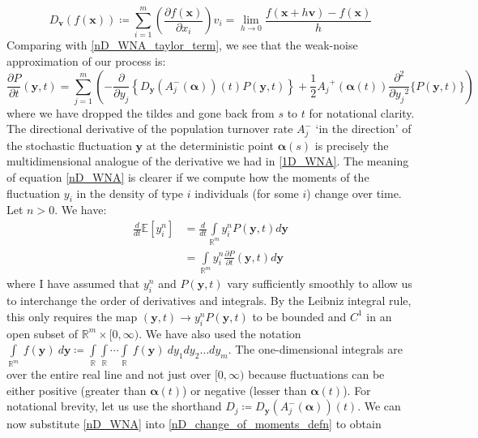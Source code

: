 \begin{equation}
\label{directional_derivative_defn}
D_{\mathbf{v}}(f(\mathbf{x})) \coloneqq \sum\limits_{i=1}^{m}\left(\frac{\partial f(\mathbf{x})}{\partial x_i}\right)v_i = \lim_{h \to 0}\frac{f(\mathbf{x}+h\mathbf{v})-f(\mathbf{x})}{h}
\end{equation}
Comparing with \eqref{nD_WNA_taylor_term}, we see that the weak-noise approximation of our process is:
\begin{equation}
\label{nD_WNA}
\frac{\partial P}{\partial t}(\mathbf{y},t) = \sum\limits_{j=1}^{m}\left(-\frac{\partial}{\partial y_j}\left\{D_{\mathbf{y}}(A_j^-(\boldsymbol{\alpha}))(t)P(\mathbf{y},t)\right\}+\frac{1}{2}{A_j}^{+}(\boldsymbol{\alpha}(t))\frac{\partial^2}{\partial{y_j}^2}\{P(\mathbf{y},t)\}\right)
\end{equation}
where we have dropped the tildes and gone back from $s$ to $t$ for notational clarity. The directional derivative of the population turnover rate $A_j^-$ `in the direction' of the stochastic fluctuation $\mathbf{y}$ at the deterministic point $\boldsymbol{\alpha}(s)$ is precisely the multidimensional analogue of the derivative we had in \eqref{1D_WNA}. The meaning of equation \eqref{nD_WNA} is clearer if we compute how the moments of the fluctuation $y_i$ in the density of type $i$ individuals (for some $i$) change over time. Let $n > 0$. We have:
\begin{align}
\frac{d}{dt}\mathbb{E}[y_i^n] &= \frac{d}{dt}\int\limits_{\mathbb{R}^m}y_i^nP(\mathbf{y},t)d\mathbf{y}\\
&= \int\limits_{\mathbb{R}^m}y_i^n\frac{\partial P}{\partial t}(\mathbf{y},t)d\mathbf{y}\label{nD_change_of_moments_defn}
\end{align}
where I have assumed that $y_i^n$ and $P(\mathbf{y},t)$ vary sufficiently smoothly to allow us to interchange the order of derivatives and integrals. By the Leibniz integral rule, this only requires the map $(\mathbf{y},t) \to y_i^nP(\mathbf{y},t)$ to be bounded and $C^1$ in an open subset of $\mathbb{R}^m \times [0,\infty)$. We have also used the notation $\displaystyle \int\limits_{\mathbb{R}^m} \ f(\mathbf{y}) \ d\mathbf{y} \coloneqq \int\limits_{\mathbb{R}}\int\limits_{\mathbb{R}}\cdots\int\limits_{\mathbb{R}} \ f(\mathbf{y}) \ dy_1 dy_2 \ldots dy_m$. The one-dimensional integrals are over the entire real line and not just over $[0,\infty)$ because fluctuations can be either positive (greater than $\boldsymbol{\alpha}(t)$) or negative (lesser than $\boldsymbol{\alpha}(t)$). For notational brevity, let us use the shorthand $D_j \coloneqq D_{\mathbf{y}}(A_j^-(\boldsymbol{\alpha}))(t)$. We can now substitute \eqref{nD_WNA} into \eqref{nD_change_of_moments_defn} to obtain
